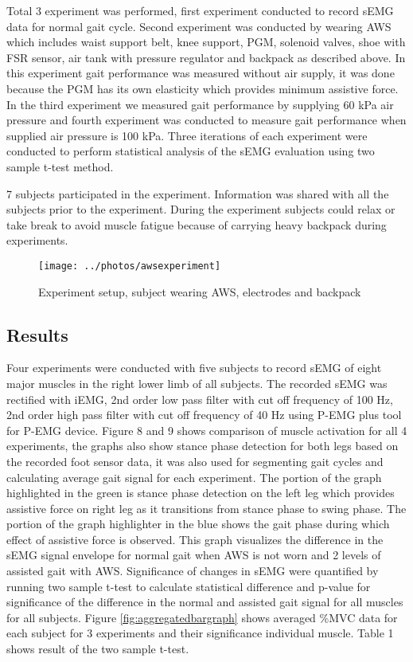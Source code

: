 \documentclass[letterpaper, 10 pt, conference]{ieeeconf}  %
\begin{document}
Total 3 experiment was performed, first experiment conducted to record sEMG data for normal gait cycle. Second experiment was conducted by wearing AWS which includes waist support belt, knee support, PGM, solenoid valves, shoe with FSR sensor, air tank with pressure regulator and backpack as described above. In this experiment gait performance was measured without air supply, it was done because the PGM has its own elasticity which provides minimum assistive force. In the third experiment we measured gait performance by supplying 60 kPa air pressure and fourth experiment was conducted to measure gait performance when supplied air pressure is 100 kPa. Three iterations of each experiment were conducted to perform statistical analysis of the sEMG evaluation using two sample t-test method.  

7 subjects participated in the experiment. Information was shared with all the subjects prior to the experiment. During the experiment subjects could relax or take break to avoid muscle fatigue because of carrying heavy backpack during experiments.


\begin{figure}
	\centering
	\texttt{[image: ../photos/awsexperiment]}
	\caption{Experiment setup, subject wearing AWS, electrodes and backpack }
	\label{fig:experimentsetup}
\end{figure}

\subsection{Results}

Four experiments were conducted with five subjects to record sEMG of eight major muscles in the right lower limb of all subjects. The recorded sEMG was rectified with iEMG, 2nd order low pass filter with cut off frequency of 100 Hz, 2nd order high pass filter with cut off frequency of 40 Hz using P-EMG plus tool for P-EMG device. Figure 8 and 9 shows comparison of muscle activation for all 4 experiments, the graphs also show stance phase detection for both legs based on the recorded foot sensor data, it was also used for segmenting gait cycles and calculating average gait signal for each experiment.  The portion of the graph highlighted in the green is stance phase detection on the left leg which provides assistive force on right leg as it transitions  from stance phase to swing phase. The portion of the graph highlighter in the blue shows the gait phase during which effect of assistive force is observed. This graph visualizes the difference in the sEMG signal envelope for normal gait when AWS is not worn and 2 levels of assisted gait with AWS. Significance of  changes in sEMG were quantified by running two sample t-test to calculate statistical difference and p-value for significance of the difference in the normal and assisted gait signal for all muscles for all subjects. Figure \ref{fig:aggregatedbargraph} shows averaged \%MVC data for each subject for 3 experiments and their significance individual muscle. Table 1 shows result of the two sample t-test.
\end{document}
